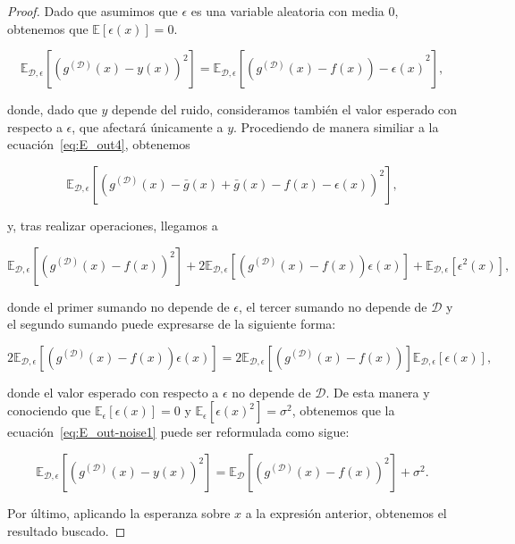 \begin{proof}
    Dado que asumimos que $\epsilon$ es una variable aleatoria con media $0$, obtenemos que $\mathbb{E}[\epsilon(x)] = 0$.

    \begin{equation}\label{eq:E_out-noise1}
        \mathbb{E}_{\mathcal{D}, \epsilon}[{(g^{\mathcal{(D)}}(x) - y(x))}^2] = \mathbb{E}_{\mathcal{D}, \epsilon}[{(g^{\mathcal{(D)}}(x) - f(x)) - \epsilon(x)}^2],
    \end{equation}

    donde, dado que $y$ depende del ruido, consideramos también el valor esperado con respecto a $\epsilon$, que afectará únicamente a $y$. Procediendo de manera similiar a la ecuación~\eqref{eq:E_out4}, obtenemos

    \begin{equation}
        \mathbb{E}_{\mathcal{D}, \epsilon}[{(g^{\mathcal{(D)}}(x) - \bar{g}(x) + \bar{g}(x) - f(x) - \epsilon(x))}^2],
    \end{equation}

    y, tras realizar operaciones, llegamos a

    \begin{equation}
        \mathbb{E}_{\mathcal{D}, \epsilon}[{(g^{\mathcal{(D)}}(x) - f(x))}^2] + 2\mathbb{E}_{\mathcal{D}, \epsilon}[(g^{\mathcal{(D)}}(x)-f(x))\epsilon(x)] + \mathbb{E}_{\mathcal{D}, \epsilon}[\epsilon^{2}(x)],
    \end{equation}

    donde el primer sumando no depende de $\epsilon$, el tercer sumando no depende de $\mathcal{D}$ y el segundo sumando puede expresarse de la siguiente forma:

    \begin{equation}
        2\mathbb{E}_{\mathcal{D}, \epsilon}[(g^{\mathcal{(D)}}(x)-f(x))\epsilon(x)] = 2\mathbb{E}_{\mathcal{D}, \epsilon}[(g^{\mathcal{(D)}}(x)-f(x))]\mathbb{E}_{\mathcal{D}, \epsilon}[\epsilon(x)],
    \end{equation}

    donde el valor esperado con respecto a $\epsilon$ no depende de $\mathcal{D}$. De esta manera y conociendo que $\mathbb{E}_{\epsilon}[\epsilon(x)] = 0$ y $\mathbb{E}_{\epsilon}[{\epsilon(x)}^{2}] = \sigma^{2}$, obtenemos que la ecuación~\eqref{eq:E_out-noise1} puede ser reformulada como sigue:

    \begin{equation}
        \mathbb{E}_{\mathcal{D}, \epsilon}[{(g^{\mathcal{(D)}}(x) - y(x))}^2] = \mathbb{E}_{\mathcal{D}}[{(g^{\mathcal{(D)}}(x) - f(x))}^2] + \sigma^{2}.
    \end{equation}

    Por último, aplicando la esperanza sobre $x$ a la expresión anterior, obtenemos el resultado buscado.
\end{proof}

